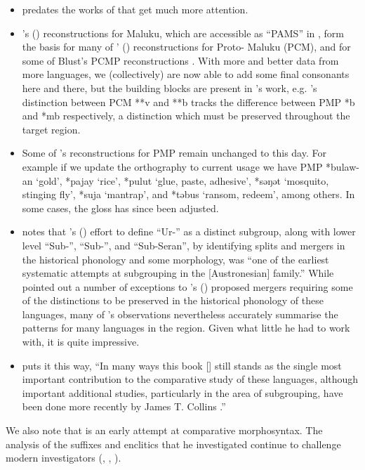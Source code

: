 {\begin{itemize}
	\item \citet{Stresemann1927} predates the works of
				\citet{Dempwolff1934,Dempwolff1937,Dempwolff1938} that get much more attention.
	\item \citeauthor{Stresemann1927}'s (\citeyear{Stresemann1927})
				reconstructions for  Maluku, which are
				accessible as “PAMS” in \citet{WurmWilson1983},
				form the basis for many of \citeauthor{Collins1983}' (\citeyear{Collins1983})
				reconstructions for Proto- Maluku (PCM),
				and for some of Blust’s PCMP reconstructions \citet{BlustTrussel2020}.
				With more and better data from more languages,
				we (collectively) are now able to add some final consonants here
				and there, but the building blocks are present in \citeauthor{Stresemann1927}’s work,
				e.g. \citeauthor{Stresemann1927}’s distinction between PCM **v
				and **b tracks the difference between PMP *b
				and *mb respectively,
				a distinction which must be preserved throughout the target region.
	\item Some of \citet{Stresemann1927}'s reconstructions for PMP
				remain unchanged to this day.
				For example if we update the orthography to current usage we have PMP *bulaw-an ‘gold’,
				*pajay ‘rice’, *pulut ‘glue, paste, adhesive’,
				*səŋət ‘mosquito, stinging fly’, *suja ‘mantrap’, and *təbus ‘ransom, redeem’, among others.
				In some cases, the gloss has since been adjusted.
	\item \citet[4]{Collins1983} notes that \citeauthor{Stresemann1927}'s (\citeyear{Stresemann1927})
				effort to define “Ur-” as a distinct subgroup,
				along with lower level “Sub-”, “Sub-”, and “Sub-Seran”,
				by identifying splits and mergers in the historical phonology
				and some morphology,
				was “one of the earliest systematic attempts at subgrouping in the [Austronesian] family.”
				While \citet{Collins1983} pointed out a number of exceptions
				to \citeauthor{Stresemann1927}'s (\citeyear{Stresemann1927}) proposed mergers requiring
				some of the distinctions to be preserved in the historical phonology of these languages,
				many of \citeauthor{Stresemann1927}’s observations nevertheless accurately
				summarise the patterns for many languages in the region.
				Given what little he had to work with,
				it is quite impressive.
	\item \citet[90]{Blust2013} puts it this way,
				“In many ways this book [\cite{Stresemann1927}] still
				stands as the single most important contribution
				to the comparative study of these languages,
				although important additional studies,
				particularly in the area of subgrouping,
				have been done more recently by James T.
				Collins \citep{Collins1982d,Collins1983}.”
\end{itemize}

We also note that \citet{Jonker1906} is an early attempt at comparative morphosyntax.
The analysis of the suffixes and enclitics that he investigated continue
to challenge modern investigators
(\citealp[vi]{Fox1968}, \citealp[30--33]{Collins1983}, \citealp{Grimes1991b}).}
